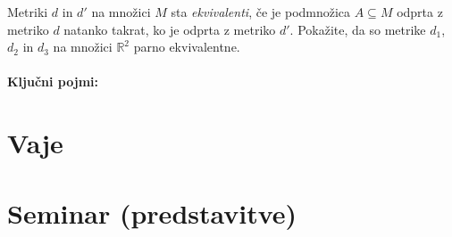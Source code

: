 \documentclass[11pt,a4paper]{exam}
\renewcommand{\subset}{\subseteq}
\renewcommand{\{}{\lbrace}
\renewcommand{\}}{\rbrace}
\begin{document}
\begin{questions}
		
		\question Metriki $d$ in $d'$ na množici $M$ sta \emph{ekvivalenti}, če je podmnožica $A \subset M$ odprta z metriko $d$ natanko takrat, ko je odprta z metriko $d'$.
		Pokažite, da so metrike $d_{1}$, $d_{2}$ in $d_{3}$ na množici $\mathbb{R}^{2}$ parno ekvivalentne. 

	\end{questions}
\pagestyle{empty}
\clearpage


\pagestyle{head}
\paragraph{Ključni pojmi:}	
\section*{Vaje}
\begin{questions}
	\question 
\end{questions}
\section*{Seminar (predstavitve)}
	\begin{questions}
		\question
	\end{questions}
\clearpage
\end{document}
